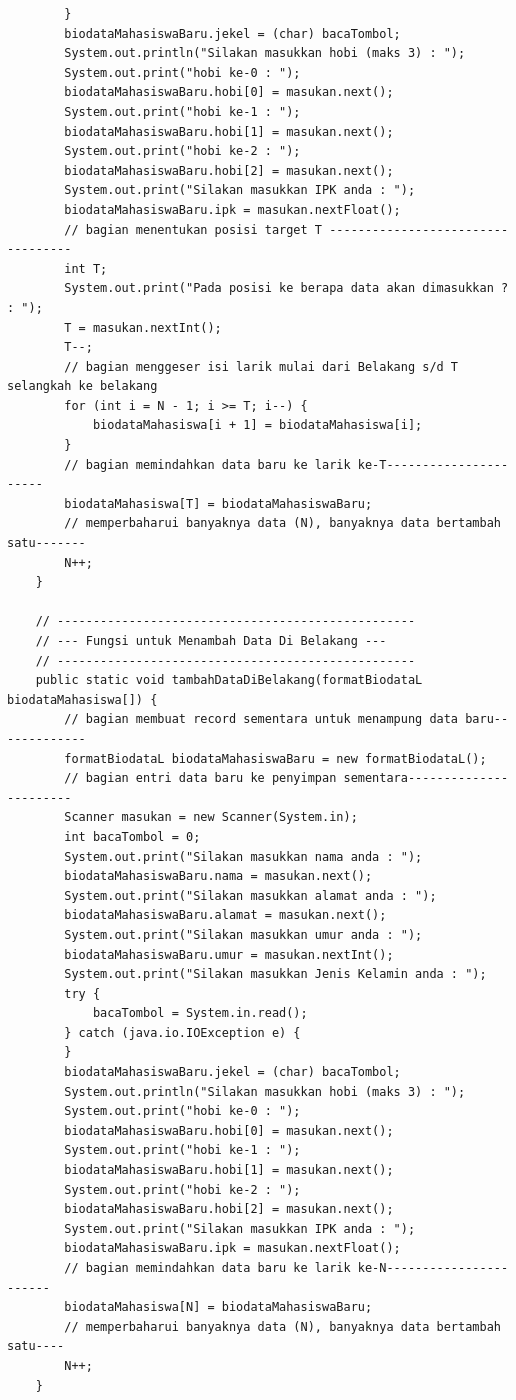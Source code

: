 \documentclass[a4paper,12pt]{article}
\begin{document}
\begin{lstlisting}
        }
        biodataMahasiswaBaru.jekel = (char) bacaTombol;
        System.out.println("Silakan masukkan hobi (maks 3) : ");
        System.out.print("hobi ke-0 : ");
        biodataMahasiswaBaru.hobi[0] = masukan.next();
        System.out.print("hobi ke-1 : ");
        biodataMahasiswaBaru.hobi[1] = masukan.next();
        System.out.print("hobi ke-2 : ");
        biodataMahasiswaBaru.hobi[2] = masukan.next();
        System.out.print("Silakan masukkan IPK anda : ");
        biodataMahasiswaBaru.ipk = masukan.nextFloat();
        // bagian menentukan posisi target T ----------------------------------
        int T;
        System.out.print("Pada posisi ke berapa data akan dimasukkan ? : ");
        T = masukan.nextInt();
        T--;
        // bagian menggeser isi larik mulai dari Belakang s/d T selangkah ke belakang
        for (int i = N - 1; i >= T; i--) {
            biodataMahasiswa[i + 1] = biodataMahasiswa[i];
        }
        // bagian memindahkan data baru ke larik ke-T----------------------
        biodataMahasiswa[T] = biodataMahasiswaBaru;
        // memperbaharui banyaknya data (N), banyaknya data bertambah satu-------
        N++;
    }

    // --------------------------------------------------
    // --- Fungsi untuk Menambah Data Di Belakang ---
    // --------------------------------------------------
    public static void tambahDataDiBelakang(formatBiodataL biodataMahasiswa[]) {
        // bagian membuat record sementara untuk menampung data baru-------------
        formatBiodataL biodataMahasiswaBaru = new formatBiodataL();
        // bagian entri data baru ke penyimpan sementara-----------------------
        Scanner masukan = new Scanner(System.in);
        int bacaTombol = 0;
        System.out.print("Silakan masukkan nama anda : ");
        biodataMahasiswaBaru.nama = masukan.next();
        System.out.print("Silakan masukkan alamat anda : ");
        biodataMahasiswaBaru.alamat = masukan.next();
        System.out.print("Silakan masukkan umur anda : ");
        biodataMahasiswaBaru.umur = masukan.nextInt();
        System.out.print("Silakan masukkan Jenis Kelamin anda : ");
        try {
            bacaTombol = System.in.read();
        } catch (java.io.IOException e) {
        }
        biodataMahasiswaBaru.jekel = (char) bacaTombol;
        System.out.println("Silakan masukkan hobi (maks 3) : ");
        System.out.print("hobi ke-0 : ");
        biodataMahasiswaBaru.hobi[0] = masukan.next();
        System.out.print("hobi ke-1 : ");
        biodataMahasiswaBaru.hobi[1] = masukan.next();
        System.out.print("hobi ke-2 : ");
        biodataMahasiswaBaru.hobi[2] = masukan.next();
        System.out.print("Silakan masukkan IPK anda : ");
        biodataMahasiswaBaru.ipk = masukan.nextFloat();
        // bagian memindahkan data baru ke larik ke-N-----------------------
        biodataMahasiswa[N] = biodataMahasiswaBaru;
        // memperbaharui banyaknya data (N), banyaknya data bertambah satu----
        N++;
    }


\end{lstlisting}
\end{document}
